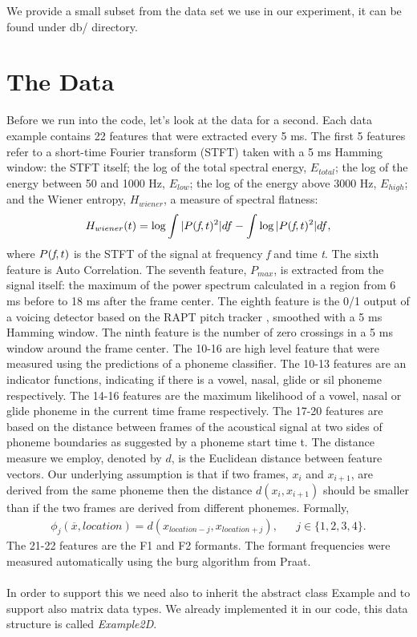 \documentclass[11pt, oneside]{article}   	%
\begin{document}
We provide a small subset from the data set we use in our experiment, it can be found under db/ directory.

\section{The Data}
Before we run into the code, let's look at the data for a second. Each data example contains 22 features that were extracted every 5 ms. The first 5 features refer to a short-time Fourier transform (STFT) taken with a 5 ms Hamming window: the STFT itself; the log of the total spectral energy, $E_{total}$; the log of the energy between 50 and 1000 Hz, $E_{low}$; the log of the energy above 3000 Hz, $E_{high}$; and the Wiener entropy, $H_{wiener}$, a measure of spectral flatness:
\begin{equation}
\label{eq:h_wiener}
H_{wiener}(t) = \log \int{|P(\emph{f},t)^2| df} - \int{\log|P(\emph{f},t)^2| df}, 
\end{equation}
where $P(\emph{f},t)$ is the STFT of the signal at frequency \emph{f} and time \emph{t}. The sixth feature is Auto Correlation. The seventh feature, $P_{max}$, is extracted from the signal itself: the maximum of the power spectrum calculated in a region from 6 ms before to 18 ms after the frame center. The eighth feature is the 0/1 output of a voicing detector based on the RAPT pitch tracker \citep{talkin1995robust}, smoothed with a 5 ms Hamming window. The ninth feature is the number of zero crossings in a 5 ms window around the frame center.
The 10-16 are high level feature that were measured using the predictions of a phoneme classifier. The 10-13 features are an indicator functions, indicating if there is a vowel, nasal, glide or sil phoneme respectively.
The 14-16 features are the maximum likelihood of a vowel, nasal or glide phoneme in the current time frame respectively. 
The 17-20 features are based on the distance between frames of the acoustical signal at two sides of phoneme boundaries as suggested by a phoneme start time t. The distance measure we employ, denoted by $d$, is the Euclidean distance between feature vectors. Our underlying assumption is that if two frames, $x_{i}$ and $x_{i+1}$, are derived from the same phoneme then the distance $d(x_{i},x_{i+1})$ should be smaller than if the two frames are derived from different phonemes. Formally, 
\begin{align*}
\label{eq:h_mfcc_function_feature}
\phi_{j}(\overline{x}, location) = d(x_{location-j}, x_{location+j}), 		& &	  j\in \{1, 2, 3, 4\}.
\end{align*}
The 21-22 features are the F1 and F2 formants. The formant frequencies were measured automatically using the burg algorithm from Praat.
\\\\
In order to support this we need also to inherit the abstract class Example and to support also matrix data types. We already implemented it in our code, this data structure is called \emph{Example2D}.
\end{document}
